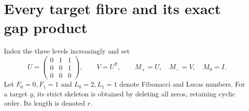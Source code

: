 \documentclass[a4paper,10pt]{amsart}
\theoremstyle{remark}
\begin{document}
\section{Every target fibre and its exact gap product}
Index the three levels increasingly and set
\begin{equation}\label{eq:matrices}
U=\begin{pmatrix}0&1&1\\0&0&1\\0&0&0\end{pmatrix},\qquad
V=U^{\mathsf T},\qquad M_+=U,\quad M_-=V,\quad M_0=I.
\end{equation}
Let $F_0=0,F_1=1$ and $L_0=2,L_1=1$ denote Fibonacci and Lucas numbers.
For a target $y$, its strict skeleton is obtained by deleting all zeros,
retaining cyclic order. Its length is denoted $r$.
\end{document}
